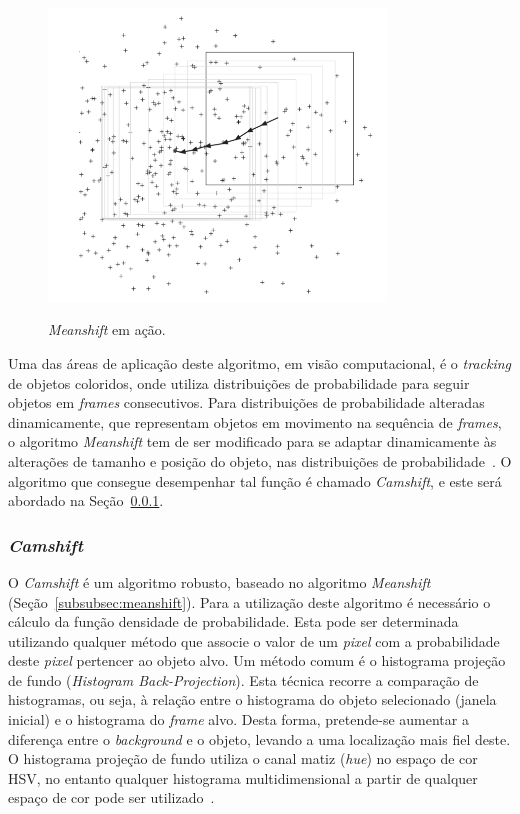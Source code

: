 \begin{figure}[!hbtp]
  \centering
   \caption{\textit{Meanshift} em ação.}
    \includegraphics[width = 0.8\textwidth]{Caps/Figs/ref-teorico/meanshift.PNG}
   \label{fig:meanshift}
\end{figure}

Uma das áreas de aplicação deste algoritmo, em visão computacional, é o \textit{tracking} de objetos coloridos, onde utiliza distribuições de probabilidade para seguir objetos em \textit{frames} consecutivos. Para distribuições de probabilidade alteradas dinamicamente, que representam objetos em movimento na sequência de \textit{frames}, o algoritmo \textit{Meanshift} tem de ser modificado para se adaptar dinamicamente às alterações de tamanho e posição do objeto, nas distribuições de probabilidade~\cite{peixoto2012deteccao}. O algoritmo que consegue desempenhar tal função é chamado \textit{Camshift}, e este será abordado na Seção~\ref{subsubsec:camshift}.

\subsubsection{\textit{Camshift}}
\label{subsubsec:camshift}

O \textit{Camshift} é um algoritmo robusto, baseado no algoritmo \textit{Meanshift} (Seção~\ref{subsubsec:meanshift}). Para a utilização deste algoritmo é necessário o cálculo da função densidade de probabilidade. Esta pode ser determinada utilizando qualquer método que associe o valor de um \textit{pixel} com a probabilidade deste \textit{pixel} pertencer ao objeto alvo. Um método comum é o histograma projeção de fundo (\textit{Histogram Back-Projection}). Esta técnica recorre a comparação de histogramas, ou seja, à relação entre o histograma do objeto selecionado (janela inicial) e o histograma do \textit{frame} alvo. Desta forma, pretende-se aumentar a diferença entre o \textit{background} e o objeto, levando a uma localização mais fiel deste. O histograma projeção de fundo utiliza o canal matiz (\textit{hue}) no espaço de cor HSV, no entanto qualquer histograma multidimensional a partir de qualquer espaço de cor pode ser utilizado~\cite{peixoto2012deteccao}.

